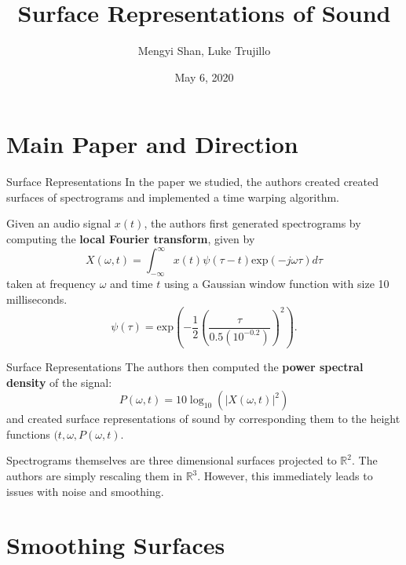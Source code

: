 \documentclass[14pt,aspectratio=169, serif, dvipsnames]{beamer}
\author{Mengyi Shan, Luke Trujillo}
\newcommand{\TT}{Surface Representations of Sound}
\begin{document}
\title{\TT}
\date{May 6, 2020} 
\titlepage

\small 

\section{Main Paper and Direction}
\begin{frame}{Surface Representations}
    In the paper we studied, the authors created created surfaces of spectrograms and implemented a time warping algorithm.
    \vspace{0.5cm}
    
    Given an audio signal $x(t)$, the authors first generated spectrograms by computing the \textbf{local Fourier transform}, given by
    \[
        X(\omega, t) = \int_{-\infty}^{\infty}x(t)\psi(\tau - t)\text{exp}(-j\omega \tau)d\tau   
    \]
    taken at frequency $\omega$ and time $t$
    using a Gaussian window function with size 10 milliseconds.
    \[
    \psi(\tau) = \text{exp}\left(-\frac{1}{2}\left(\frac{\tau}{0.5(10^{-0.2})}\right)^2\right).
    \]
\end{frame}

\begin{frame}{Surface Representations}
    The authors then computed the \textbf{power spectral density} of the signal:
    \[
        P(\omega, t) = 10\log_{10}(|X(\omega, t)|^2) 
    \]
    and created surface representations of sound by corresponding them 
    to the height functions $(t, \omega, P(\omega, t)$.
    \vspace{1cm}
    
    Spectrograms themselves are three dimensional surfaces projected to $\mathbb{R}^2$. 
    The authors are simply rescaling them in $\mathbb{R}^3$.
    However, this immediately leads to issues with noise and smoothing.

\end{frame}

\section{Smoothing Surfaces}
\end{document}
